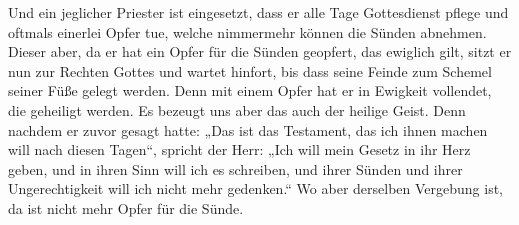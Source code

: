  Und ein jeglicher Priester ist eingesetzt, dass er alle
Tage Gottesdienst pflege und oftmals einerlei Opfer tue, welche
nimmermehr können die Sünden abnehmen.  Dieser aber, da
er hat ein Opfer für die Sünden geopfert, das ewiglich gilt, sitzt er
nun zur Rechten Gottes  und wartet hinfort, bis dass
seine Feinde zum Schemel seiner Füße gelegt werden.  Denn
mit einem Opfer hat er in Ewigkeit vollendet, die geheiligt werden.
 Es bezeugt uns aber das auch der heilige Geist. Denn
nachdem er zuvor gesagt hatte:  „Das ist das Testament,
das ich ihnen machen will nach diesen Tagen``, spricht der Herr: „Ich
will mein Gesetz in ihr Herz geben, und in ihren Sinn will ich es
schreiben,  und ihrer Sünden und ihrer Ungerechtigkeit
will ich nicht mehr gedenken.``  Wo aber derselben
Vergebung ist, da ist nicht mehr Opfer für die Sünde.

